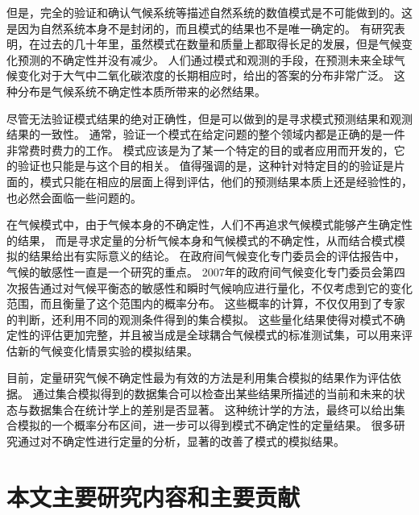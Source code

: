 但是，完全的验证和确认气候系统等描述自然系统的数值模式是不可能做到的。这是因为自然系统本身不是封闭的，而且模式的结果也不是唯一确定的\cite{oreskes1994verification}。
有研究表明，在过去的几十年里，虽然模式在数量和质量上都取得长足的发展，但是气候变化预测的不确定性并没有减少。 
人们通过模式和观测的手段，在预测未来全球气候变化对于大气中二氧化碳浓度的长期相应时，给出的答案的分布非常广泛。
这种分布是气候系统不确定性本质所带来的必然结果\cite{roe2007climate}。 

尽管无法验证模式结果的绝对正确性，但是可以做到的是寻求模式预测结果和观测结果的一致性。
通常，验证一个模式在给定问题的整个领域内都是正确的是一件非常费时费力的工作。  
模式应该是为了某一个特定的目的或者应用而开发的，它的验证也只能是与这个目的相关\cite{sargent2005verification}。
值得强调的是，这种针对特定目的的验证是片面的，模式只能在相应的层面上得到评估，他们的预测结果本质上还是经验性的，也必然会面临一些问题的。


在气候模式中，由于气候本身的不确定性，人们不再追求气候模式能够产生确定性的结果，
而是寻求定量的分析气候本身和气候模式的不确定性，从而结合模式模拟的结果给出有实际意义的结论。
在政府间气候变化专门委员会的评估报告中，气候的敏感性一直是一个研究的重点。
2007年的政府间气候变化专门委员会第四次报告通过对气候平衡态的敏感性和瞬时气候响应进行量化，不仅考虑到它的变化范围，而且衡量了这个范围内的概率分布。
这些概率的计算，不仅仅用到了专家的判断，还利用不同的观测条件得到的集合模拟。 
这些量化结果使得对模式不确定性的评估更加完整，并且被当成是全球耦合气候模式的标准测试集，可以用来评估新的气候变化情景实验的模拟结果\cite{meehl2007global}。 
 
目前，定量研究气候不确定性最为有效的方法是利用集合模拟的结果作为评估依据\cite{von2013testing,reynolds1994random, allen2002towards}。
通过集合模拟得到的数据集合可以检查出某些结果所描述的当前和未来的状态与数据集合在统计学上的差别是否显著。
这种统计学的方法，最终可以给出集合模拟的一个概率分布区间，进一步可以得到模式不确定性的定量结果。
很多研究通过对不确定性进行定量的分析，显著的改善了模式的模拟结果\cite{reynolds1994random}。


\section{本文主要研究内容和主要贡献}

